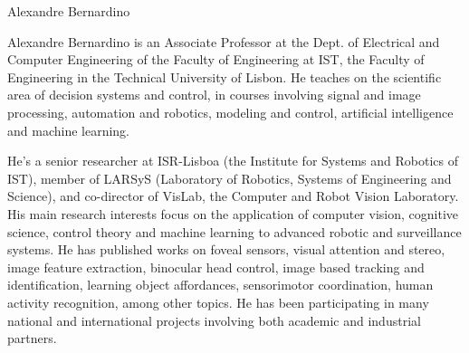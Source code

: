 \begin{IEEEbiography}{Alexandre Bernardino}

Alexandre Bernardino is an Associate Professor at the Dept. of Electrical and Computer Engineering of the Faculty of Engineering at IST, the Faculty of Engineering in the Technical University of Lisbon.
He teaches on the scientific area of decision systems and control, in courses involving signal and image processing, automation and robotics, modeling and control, artificial intelligence and machine learning.

He's a senior researcher at ISR-Lisboa (the Institute for Systems and Robotics of IST), member of LARSyS (Laboratory of Robotics, Systems of Engineering and Science), and co-director of VisLab, the Computer and Robot Vision Laboratory.
His main research interests focus on the application of computer vision, cognitive science, control theory and machine learning to advanced robotic and surveillance systems.
He has published works on foveal sensors, visual attention and stereo, image feature extraction, binocular head control, image based tracking and identification, learning object affordances, sensorimotor coordination, human activity recognition, among other topics. He has been participating in many national and international projects involving both academic and industrial partners.
\end{IEEEbiography}